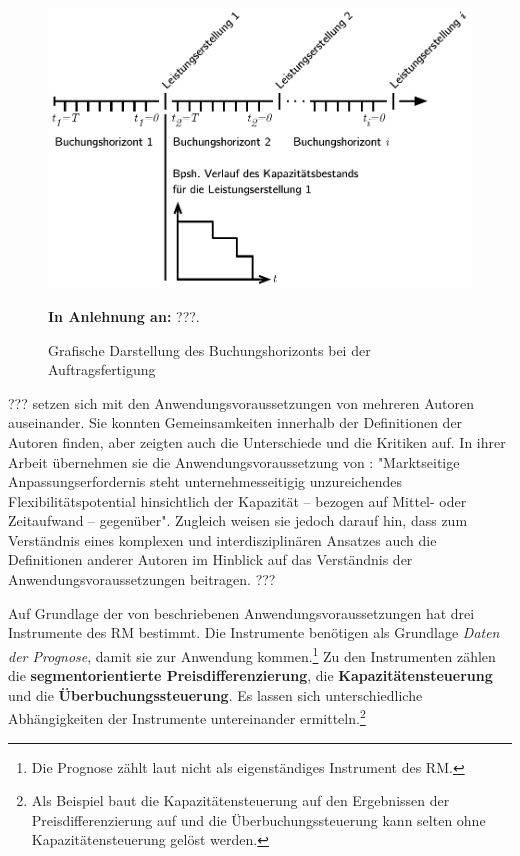 \begin{figure}[h!]
  \begin{center}
    \includegraphics[width=140mm]{Bilder/Kapaverbrauch.pdf}
    \caption{Grafische Darstellung des Buchungshorizonts bei der Auftragsfertigung}  \label{B0}
    {\footnotesize \textbf{In Anlehnung an:} ???.} 
  \end{center}
\end{figure}


??? \cite{Klein:2008aa} setzen sich mit den Anwendungsvoraussetzungen von mehreren Autoren auseinander. Sie konnten Gemeinsamkeiten innerhalb der Definitionen der Autoren finden, aber zeigten auch die Unterschiede und die Kritiken auf. In ihrer Arbeit übernehmen sie die Anwendungsvoraussetzung von \cite{corsten1998yield}: "Marktseitige Anpassungserfordernis steht unternehmesseitigig unzureichendes Flexibilitätspotential hinsichtlich der Kapazität -- bezogen auf Mittel- oder Zeitaufwand -- gegenüber". Zugleich weisen sie jedoch darauf hin, dass zum Verständnis eines komplexen und interdisziplinären Ansatzes auch die Definitionen anderer Autoren im Hinblick auf das Verständnis der Anwendungsvoraussetzungen beitragen. ???

Auf Grundlage der von \cite{friege1996yield} beschriebenen Anwendungsvoraussetzungen hat \cite{Petrick:2009aa} drei Instrumente des RM bestimmt. Die Instrumente benötigen als Grundlage \textit{Daten der Prognose}, damit sie zur Anwendung kommen.\footnote{Die Prognose zählt laut \cite{Petrick:2009aa} nicht als eigenständiges Instrument des RM.} Zu den Instrumenten zählen die \textbf{segmentorientierte Preisdifferenzierung}, die \textbf{Kapazitäten\-steuerung} und die \textbf{Über\-buchungssteuerung}. Es lassen sich unterschiedliche Ab\-hängigkeit\-en der Instrumente untereinander ermitteln.\footnote{Als Beispiel baut die Kapazitätensteu\-erung auf den Ergebnissen der Preisdifferenzierung auf und die Überbuchungssteuerung kann selten ohne Kapazitätensteuerung gelöst werden.}

